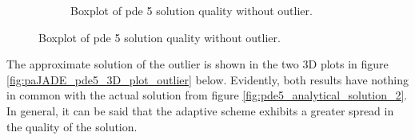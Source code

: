 \documentclass[./\jobname.tex]{subfiles}
\begin{document}
\begin{figure}[H]
\begin{subfigure}[b]{0.39\linewidth}
		\caption{Boxplot of \gls{pde} 5 solution quality without outlier. }
		\label{fig:paJADE_pde5_l2norm_boxplot_cleared}
	\end{subfigure}%
	\label{fig:paJADE_pde5_l2norm_boxplot_comparison}
\end{figure}

The approximate solution of the outlier is shown in the two 3D plots in figure \ref{fig:paJADE_pde5_3D_plot_outlier} below. Evidently, both results have nothing in common with the actual solution from figure \ref{fig:pde5_analytical_solution_2}. In general, it can be said that the adaptive scheme exhibits a greater spread in the quality of the solution. 
\end{document}
